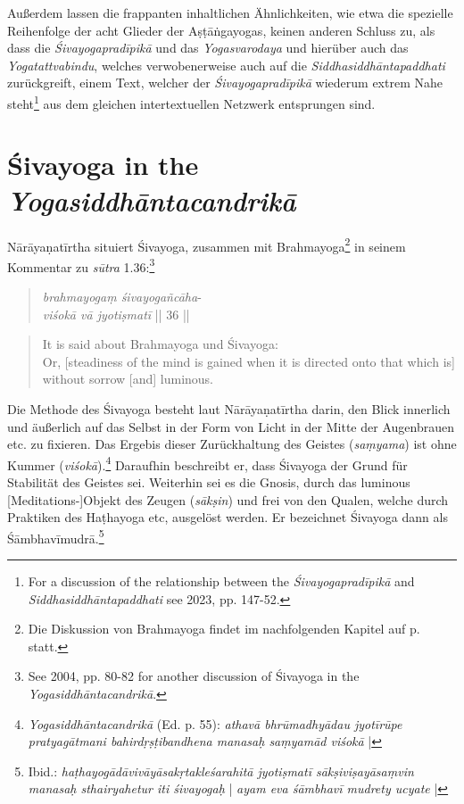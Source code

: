   Außerdem lassen die frappanten inhaltlichen Ähnlichkeiten, wie etwa die spezielle Reihenfolge der acht Glieder der Aṣṭāṅgayogas, keinen anderen Schluss zu, als dass die \textit{Śivayogapradīpikā} und das \textit{Yogasvarodaya} und hierüber auch das \textit{Yogatattvabindu}, welches verwobenerweise auch auf die \textit{Siddhasiddhāntapaddhati} zurückgreift, einem Text, welcher der \textit{Śivayogapradīpikā} wiederum extrem Nahe steht\footnote{For a discussion of the relationship between the \textit{Śivayogapradīpikā} and \textit{Siddhasiddhāntapaddhati} see \citeauthor{powell2023} 2023, pp. 147-52.} aus dem gleichen intertextuellen Netzwerk entsprungen sind. 

\section{Śivayoga in the \textit{Yogasiddhāntacandrikā}}
\label{sivayogacandri}
Nārāyaṇatīrtha situiert Śivayoga, zusammen mit Brahmayoga\footnote{Die Diskussion von Brahmayoga findet im nachfolgenden Kapitel auf p.\pageref{brahmayogaintro} statt.} in seinem Kommentar zu \textit{sūtra} 1.36:\footnote{See \citeauthor{penna2004} 2004, pp. 80-82 for another discussion of Śivayoga in the \textit{Yogasiddhāntacandrikā}.}

\begin{quote}
\textit{brahmayogaṃ śivayogañcāha}-\\
\textit{viśokā vā jyotiṣmatī} || 36 ||
\end{quote}
\begin{quote}
It is said about Brahmayoga und Śivayoga: \\
Or, [steadiness of the mind is gained when it is directed onto that which is] without sorrow [and] luminous.  
\end{quote}

Die Methode des Śivayoga besteht laut Nārāyaṇatīrtha darin, den Blick innerlich und äußerlich auf das Selbst in der Form von Licht in der Mitte der Augenbrauen etc. zu fixieren. Das Ergebis dieser Zurückhaltung des Geistes (\textit{saṃyama}) ist ohne Kummer (\textit{viśokā}).\footnote{\textit{Yogasiddhāntacandrikā} (Ed. p. 55): \textit{athavā bhrūmadhyādau jyotīrūpe pratyagātmani bahirdṛṣṭibandhena manasaḥ saṃyamād viśokā} |} Daraufhin beschreibt er, dass Śivayoga der Grund für Stabilität des Geistes sei. Weiterhin sei es die Gnosis, durch das luminous [Meditations-]Objekt des Zeugen (\textit{sākṣin}) und frei von den Qualen, welche durch Praktiken des Haṭhayoga etc, ausgelöst werden. Er bezeichnet Śivayoga dann als Śāmbhavīmudrā.\footnote{Ibid.: \textit{haṭhayogādāvivāyāsakṛtakleśarahitā jyotiṣmatī sākṣiviṣayāsaṃvin manasaḥ sthairyahetur iti śivayogaḥ} | \textit{ayam eva śāmbhavī mudrety ucyate} |}

